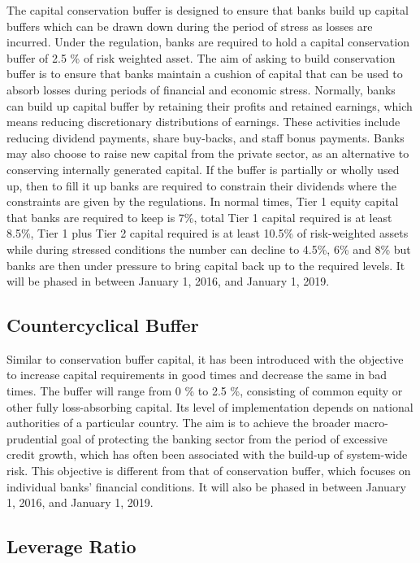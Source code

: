 \documentclass[11pt]{article}
\numberwithin{equation}{section}
\begin{document}
The capital conservation buffer is designed to ensure that banks build up capital buffers which can be drawn down during the period of stress as losses are  incurred. Under the regulation, banks are required to hold a capital conservation buffer of 2.5 \% of risk weighted asset. The aim of  asking to build conservation buffer is to ensure that banks maintain a cushion of capital that can be used to absorb losses during periods of financial and economic stress. Normally, banks can build up capital buffer by retaining their profits and retained earnings, which means reducing discretionary distributions of earnings. These activities include reducing dividend payments, share buy-backs, and staff bonus payments. Banks may also choose to raise new capital from the private sector, as an alternative to conserving internally generated capital. If the buffer is partially or wholly used up, then to fill it up banks are required to constrain their dividends where the constraints are given by the regulations. In normal times, Tier 1 equity capital that banks are required to keep is 7\%, total Tier 1 capital required is at least 8.5\%, Tier 1 plus Tier 2 capital  required is at least 10.5\% of risk-weighted assets while during stressed conditions the number can decline to 4.5\%, 6\% and 8\%  but banks are then under pressure to bring capital back up to the required levels. It will be phased in between January 1, 2016, and January 1, 2019.

\subsection{Countercyclical Buffer}
\medskip

Similar to conservation buffer capital, it has been introduced with the objective to increase capital requirements in good times and decrease the same in bad times. The buffer will range from 0 \% to 2.5 \%, consisting of common equity or other fully loss-absorbing capital. Its level of implementation depends on national authorities of a particular country. The aim is to achieve the broader macro-prudential goal of protecting the banking sector from the period of excessive credit growth, which has often been associated with the build-up of system-wide risk. This objective is different from that of conservation buffer, which focuses on individual banks' financial conditions. It will also be phased in between January 1, 2016, and January 1, 2019.

\subsection{Leverage Ratio}
\medskip
\end{document}
